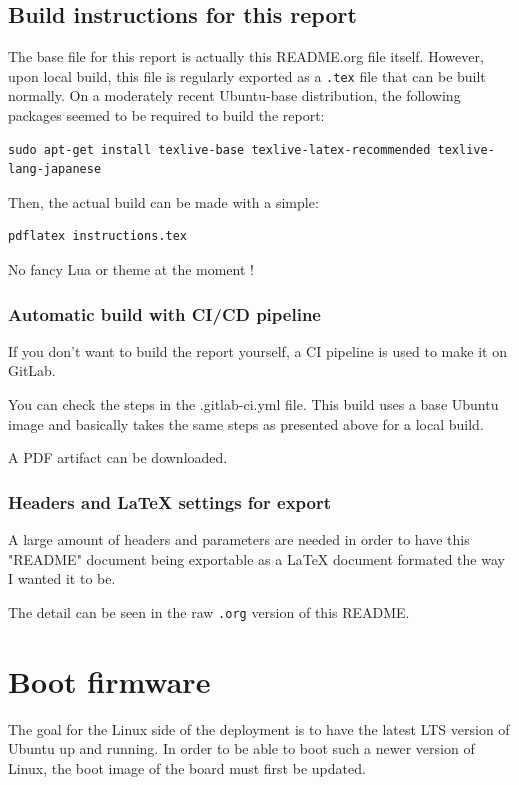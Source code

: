 \documentclass[10pt]{article}
\begin{document}
\subsection{Build instructions for this report}
\label{sec:orgd9dd5b2}
The base file for this report is actually this README.org file itself.
However, upon local build, this file is regularly exported as
a \texttt{.tex} file that can be built normally.
On a moderately recent Ubuntu-base distribution, the following packages seemed to be required to build the
report:

\begin{verbatim}
sudo apt-get install texlive-base texlive-latex-recommended texlive-lang-japanese
\end{verbatim}

Then, the actual build can be made with a simple:

\begin{verbatim}
pdflatex instructions.tex
\end{verbatim}

No fancy Lua or theme at the moment !

\subsubsection{Automatic build with CI/CD pipeline}
\label{sec:org58dc63c}
If you don't want to build the report yourself, a CI pipeline is used to make it on GitLab.

You can check the steps in the .gitlab-ci.yml file.
This build uses a base Ubuntu image and basically takes the same steps as presented above for a local build.

A PDF artifact can be downloaded.

\subsubsection{Headers and \LaTeX{} settings for export}
\label{sec:orgad60a17}
A large amount of headers and parameters are needed in order
to have this "README" document being exportable as a \LaTeX{}
document formated the way I wanted it to be.

The detail can be seen in the raw \texttt{.org} version of this README.

\section{Boot firmware}
\label{sec:org9a1b3b6}
The goal for the Linux side of the deployment is to
have the latest LTS version of Ubuntu up and running.
In order to be able to boot such a newer version of Linux, the
boot image of the board must first be updated.
\end{document}
